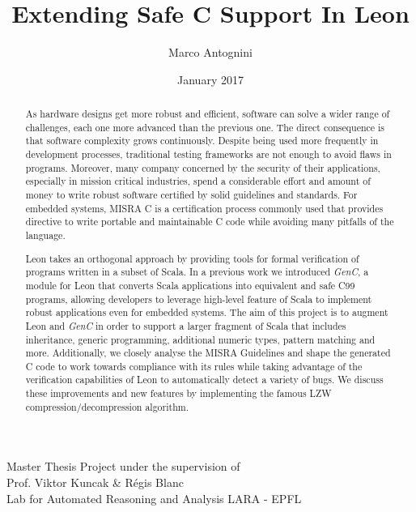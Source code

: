 \documentclass[a4paper,twoside]{article}
\title{Extending Safe C Support In Leon}
\date{January 2017}
\author{Marco Antognini}
\newcommand{\GenC}{\emph{GenC}\xspace}
\begin{document}
\maketitle

\vfill

\begin{abstract}

As hardware designs get more robust and efficient, software can solve a wider
range of challenges, each one more advanced than the previous one. The direct
consequence is that software complexity grows continuously. Despite being used
more frequently in development processes, traditional testing frameworks are not
enough to avoid flaws in programs. Moreover, many company concerned by the
security of their applications, especially in mission critical industries, spend
a considerable effort and amount of money to write robust software certified by
solid guidelines and standards. For embedded systems, MISRA C is a certification
process commonly used that provides directive to write portable and maintainable
C code while avoiding many pitfalls of the language.

Leon takes an orthogonal approach by providing tools for formal verification of
programs written in a subset of Scala. In a previous work we introduced \GenC, a
module for Leon that converts Scala applications into equivalent and safe C99
programs, allowing developers to leverage high-level feature of Scala to
implement robust applications even for embedded systems. The aim of this project
is to augment Leon and \GenC in order to support a larger fragment of Scala that
includes inheritance, generic programming, additional numeric types, pattern
matching and more. Additionally, we closely analyse the MISRA Guidelines and
shape the generated C code to work towards compliance with its rules while
taking advantage of the verification capabilities of Leon to automatically
detect a variety of bugs. We discuss these improvements and new features by
implementing the famous LZW compression/decompression algorithm.

\end{abstract}

\vfill

\begin{center}
    Master Thesis Project under the supervision of \\
    Prof. Viktor Kuncak \& Régis Blanc \\
    Lab for Automated Reasoning and Analysis LARA - EPFL
\end{center}
\end{document}
